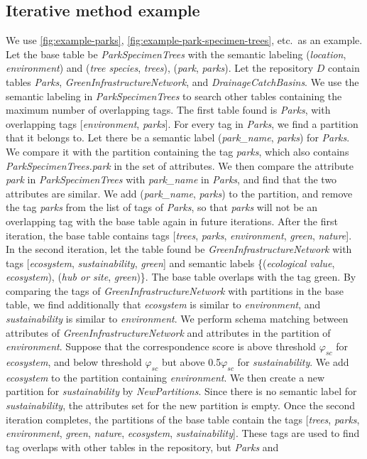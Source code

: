 \subsection{Iterative method example}
\label{ssec:IterativeMethodExample}

We use \autoref{fig:example-parks}, \autoref{fig:example-park-specimen-trees}, etc.~as an example. Let the base table be \textit{ParkSpecimenTrees} with the semantic labeling (\textit{location}, \textit{environment}) and (\textit{tree species}, \textit{trees}), (\textit{park}, \textit{parks}). Let the repository $D$ contain tables \textit{Parks}, \textit{GreenInfrastructureNetwork}, and \textit{DrainageCatchBasins}. We use the semantic labeling in \textit{ParkSpecimenTrees} to search other tables containing the maximum number of overlapping tags. The first table found is \textit{Parks}, with overlapping tags [\textit{environment}, \textit{parks}]. For every tag in \textit{Parks}, we find a partition that it belongs to. Let there be a semantic label (\textit{park\_name}, \textit{parks}) for \textit{Parks}. We compare it with the partition containing the tag \textit{parks}, which also contains \textit{ParkSpecimenTrees.park} in the set of attributes. We then compare the attribute \textit{park} in \textit{ParkSpecimenTrees} with \textit{park\_name} in \textit{Parks}, and find that the two attributes are similar. We add (\textit{park\_name}, \textit{parks}) to the partition, and remove the tag \textit{parks} from the list of tags of \textit{Parks}, so that \textit{parks} will not be an overlapping tag with the base table again in future iterations. After the first iteration, the base table contains tags [\textit{trees}, \textit{parks}, \textit{environment}, \textit{green}, \textit{nature}]. In the second iteration, let the table found be \textit{GreenInfrastructureNetwork} with tags [\textit{ecosystem}, \textit{sustainability}, \textit{green}] and semantic labels \{(\textit{ecological value}, \textit{ecosystem}), (\textit{hub or site}, \textit{green})\}. The base table overlaps with the tag green. By comparing the tags of \textit{GreenInfrastructureNetwork} with partitions in the base table, we find additionally that \textit{ecosystem} is similar to \textit{environment}, and \textit{sustainability} is similar to \textit{environment}. We perform schema matching between attributes of \textit{GreenInfrastructureNetwork} and attributes in the partition of \textit{environment}. Suppose that the correspondence score is above threshold $\ensuremath{\varphi}_{sc}$ for \textit{ecosystem}, and below threshold $\ensuremath{\varphi}_{sc}$ but above 0.5$\ensuremath{\varphi}_{sc}$ for \textit{sustainability}. We add \textit{ecosystem} to the partition containing \textit{environment}. We then create a new partition for \textit{sustainability} by \textit{NewPartitions}. Since there is no semantic label for \textit{sustainability}, the attributes set for the new partition is empty. Once the second iteration completes, the partitions of the base table contain the tags [\textit{trees}, \textit{parks}, \textit{environment}, \textit{green}, \textit{nature}, \textit{ecosystem}, \textit{sustainability}]. These tags are used to find tag overlaps with other tables in the repository, but \textit{Parks} and 